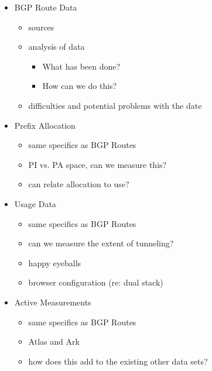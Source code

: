 \begin{itemize}
    \item BGP Route Data
    \begin{itemize}
        \item sources
        \item analysis of data
        \begin{itemize}
            \item What has been done?
            \item How can we do this?
        \end{itemize}
        \item difficulties and potential problems with the date
    \end{itemize}
    \item Prefix Allocation
    \begin{itemize}
        \item same specifics as BGP Routes
        \item PI vs. PA space, can we measure this?
        \item can relate allocation to use?
    \end{itemize}
    \item Usage Data
    \begin{itemize}
        \item same specifics as BGP Routes
        \item can we measure the extent of tunneling?
        \item happy eyeballs
        \item browser configuration (re: dual stack)
    \end{itemize}
    \item Active Measurements
    \begin{itemize}
        \item same specifics as BGP Routes
        \item Atlas and Ark
        \item how does this add to the existing other data sets?
    \end{itemize}
\end{itemize}
